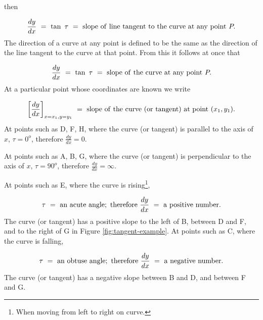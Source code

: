 \noindent
then

\[
\frac{dy}{dx}\ =\ \tan\ \tau\ =\ {\rm slope\ of\ line\ 
tangent\ to\ the\ curve\ at\ any\ point\ } P.
\]
The direction of a curve at any point is defined to 
be the same as the direction of the line tangent to the 
curve at that point. From this it follows at once that

\[
    \frac{dy}{dx}\ =\ \tan\ \tau\ = \ {\rm slope\ of\ the\ 
curve\ at\ any\ point\ } P. 
\]
At a particular point whose coordinates are known we write

\[
  \left [ \frac{dy}{dx} \right ]_{x=x_1, y=y_1}\ = 
\ {\rm slope\ of\ the\ curve\ (or\ tangent)\ at\ point\ } (x_1,y_1).
\]
At points such as D, F, H, where the curve (or tangent) 
is parallel to the axis of $x$, $\tau = 0^o$,
therefore $\frac{dy}{dx} = 0$.

At points such as A, B, G, where the curve (or tangent) is 
perpendicular to the axis of $x$, $\tau = 90^o$,
therefore $\frac{dy}{dx} = \infty$.

At points such as E, where the curve is rising\footnote{When 
moving from left to right on curve.},

\[
\tau \ = \ {\rm an\ acute\ angle;\ therefore\ }
\frac{dy}{dx}\ =\ {\rm a\ positive\ number}.
\]
The curve (or tangent) has a positive slope to the left of B, 
between D and F, and to the right of G in 
Figure \ref{fig:tangent-example}. %
At points such as C, where the curve is falling,

\[
\tau \ = \ {\rm an\ obtuse\ angle;\ therefore\ }
\frac{dy}{dx}\ =\ {\rm a\ negative\ number}.
\]
The curve (or tangent) has a negative slope between B and D, 
and between F and G.


